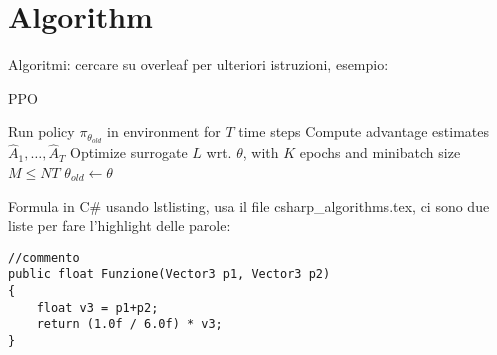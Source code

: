 \chapter{Algorithm}

Algoritmi: cercare su overleaf per ulteriori istruzioni, esempio:

\begin{algorithm}
	\caption{PPO} 
	\begin{algorithmic}[1]
				\State Run policy $\pi_{\theta_{old}}$ in environment for $T$ time steps
				\State Compute advantage estimates $\hat{A}_{1},\ldots,\hat{A}_{T}$
			\EndFor
			\State Optimize surrogate $L$ wrt. $\theta$, with $K$ epochs and minibatch size $M\leq NT$
			\State $\theta_{old}\leftarrow\theta$
		\EndFor
	\end{algorithmic} 
\end{algorithm}



Formula in C\# usando lstlisting, usa il file csharp\_algorithms.tex, ci sono due liste per fare l'highlight delle parole:
\\
\begin{minipage}{1\linewidth}
\begin{lstlisting}
//commento
public float Funzione(Vector3 p1, Vector3 p2)
{
    float v3 = p1+p2;
    return (1.0f / 6.0f) * v3;
}
\end{lstlisting}
\end{minipage}